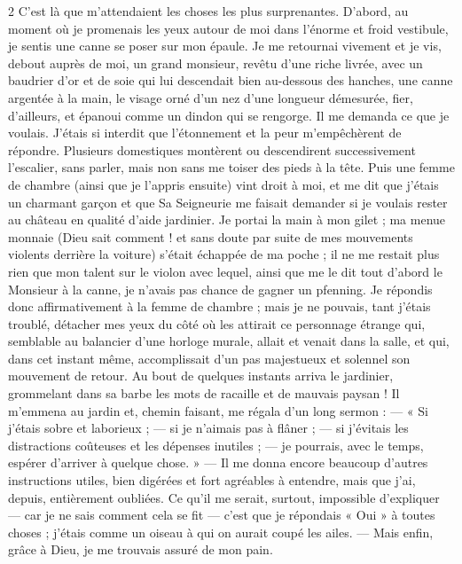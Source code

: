 \documentclass[a4paper,11pt]{article}
\begin{document}
\begin{paracol}{2}
         {C’est là que m’attendaient les choses les plus surprenantes. D’abord, au moment où je promenais les yeux autour de moi dans l’énorme et froid vestibule, je sentis une canne se poser sur mon épaule. Je me retournai vivement et je vis, debout auprès de moi, un grand monsieur, revêtu d’une riche livrée, avec un baudrier d’or et de soie qui lui descendait bien au-dessous des hanches, une canne argentée à la main, le visage orné d’un nez d’une longueur démesurée, fier, d’ailleurs, et épanoui comme un dindon qui se rengorge. Il me demanda ce que je voulais. J’étais si interdit que l’étonnement et la peur m’empêchèrent de répondre. Plusieurs domestiques montèrent ou descendirent successivement l’escalier, sans parler, mais non sans me toiser des pieds à la tête. Puis une femme de chambre (ainsi que je l’appris ensuite) vint droit à moi, et me dit que j’étais un charmant garçon et que Sa Seigneurie me faisait demander si je voulais rester au château en qualité d’aide jardinier. Je portai la main à mon gilet ; ma menue monnaie (Dieu sait comment ! et sans doute par suite de mes mouvements violents derrière la voiture) s’était échappée de ma poche ; il ne me restait plus rien que mon talent sur le violon avec lequel, ainsi que me le dit tout d’abord le Monsieur à la canne, je n’avais pas chance de gagner un pfenning. Je répondis donc affirmativement à la femme de chambre ; mais je ne pouvais, tant j’étais troublé, détacher mes yeux du côté où les attirait ce personnage étrange qui, semblable au balancier d’une horloge murale, allait et venait dans la salle, et qui, dans cet instant même, accomplissait d’un pas majestueux et solennel son mouvement de retour. Au bout de quelques instants arriva le jardinier, grommelant dans sa barbe les mots de racaille et de mauvais paysan ! Il m’emmena au jardin et, chemin faisant, me régala d’un long sermon : --- « Si j’étais sobre et laborieux ; --- si je n’aimais pas à flâner ; --- si j’évitais les distractions coûteuses et les dépenses inutiles ; --- je pourrais, avec le temps, espérer d’arriver à quelque chose. » --- Il me donna encore beaucoup d’autres instructions utiles, bien digérées et fort agréables à entendre, mais que j’ai, depuis, entièrement oubliées. Ce qu’il me serait, surtout, impossible d’expliquer --- car je ne sais comment cela se fit --- c’est que je répondais « Oui » à toutes choses ; j’étais comme un oiseau à qui on aurait coupé les ailes. --- Mais enfin, grâce à Dieu, je me trouvais assuré de mon pain.}

\end{paracol}
\end{document}
